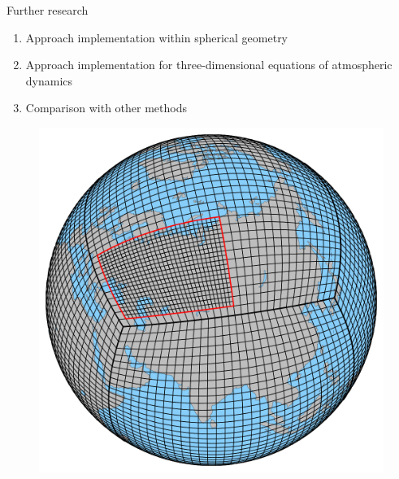 \documentclass[10pt]{beamer}
\begin{document}
\begin{frame}{Further research}

\begin{enumerate}
\item Approach implementation within spherical geometry
\item Approach implementation for three-dimensional equations of atmospheric dynamics
\item Comparison with other methods

\end{enumerate}

\end{frame}

\begin{frame}
\begin{figure}[h]
\centering
\includegraphics[width=0.4\linewidth]{./images/cubsphere.png}
\end{figure}
\end{frame}
\end{document}
